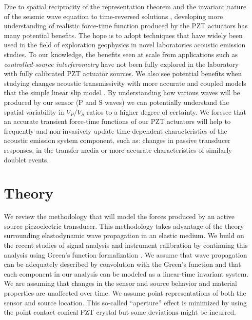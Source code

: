 \documentclass[preprint,3p, 11pt,authoryear]{elsarticle}
\begin{document}
Due to spatial reciprocity of the representation theorem \citep{Aki2002} and the invariant nature of the seismic wave equation to time-reversed solutions \citep{Fink1992}, developing more understanding of realistic force-time function produced by the PZT actuators has many potential benefits. The hope is to adopt techniques that have widely been used in the field of exploration geophysics in novel laboratories acoustic emission studies. To our knowledge, the benefits seen at scale from applications such as \textit{controlled-source interferometry} have not been fully explored in the laboratory with fully calibrated PZT actuator sources. We also see potential benefits when studying changes acoustic transmissivity \citep{PyrakNolte1980} with more accurate and coupled models that the simple linear slip model \citep[LSM,][]{Kendall1957}.  By understanding how various waves will be produced by our sensor (P and S waves) we can potentially understand the spatial variability in $V_{P}/V_{S}$ ratios to a higher degree of certainty. We foresee that an accurate transient force-time functions of our PZT actuators will help to frequently and non-invasively update time-dependent characteristics of the acoustic emission system component, such as: changes in passive transducer responses, in the transfer media or more accurate characteristics of similarly doublet events.  

\section{Theory}
\label{theo}


We review the methodology that will model the forces produced by an active source piezoelectric transducer.  This methodology takes advantage of the theory surrounding elastodynamic wave propagation in an elastic medium.  We build on the recent studies of signal analysis and instrument calibration by \citet{McLaksey2012} continuing this analysis using Green's function formalization \citep{Aki2002, Johnson1974}. We assume that wave propagation can be adequately described by convolution with the Green's function and that each component in our analysis can be modeled as a linear-time invariant system.  We are assuming that changes in the sensor and source behavior and material properties are unaffected over time.  We assume point representations of both the sensor and source location. This so-called ``aperture'' effect is minimized by using the point contact conical PZT crystal but some deviations might be incurred.
\end{document}
